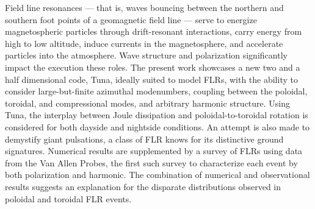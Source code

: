 
Field line resonances --- that is, \Alfven waves bouncing between the northern
and southern foot points of a geomagnetic field line --- serve to energize
magnetospheric particles through drift-resonant interactions, carry energy from
high to low altitude, induce currents in the magnetosphere, and accelerate
particles into the atmosphere. Wave structure and polarization significantly
impact the execution these roles. The present work showcases a new two and a
half dimensional code, Tuna, ideally suited to model FLRs, with the ability to
consider large-but-finite azimuthal modenumbers, coupling between the poloidal,
toroidal, and compressional modes, and arbitrary harmonic structure. Using
Tuna, the interplay between Joule dissipation and poloidal-to-toroidal rotation
is considered for both dayside and nightside conditions. An attempt is also
made to demystify giant pulsations, a class of FLR knows for its distinctive
ground signatures. Numerical results are supplemented by a survey of 
FLRs using data from the Van Allen Probes, the first such survey to
characterize each event by both polarization and harmonic. The combination of
numerical and observational results suggests an explanation for the disparate
distributions observed in poloidal and toroidal FLR events. 



